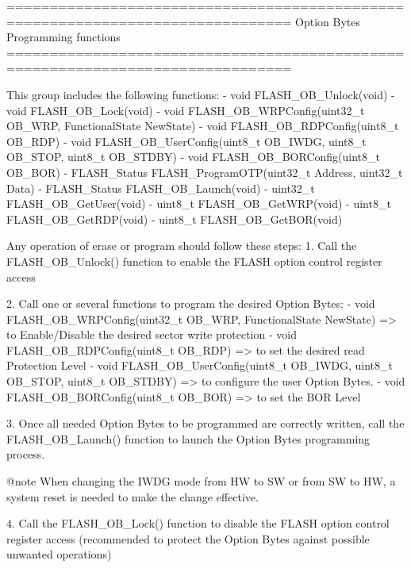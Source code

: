 \begin{DoxyVerb} ===============================================================================
                        Option Bytes Programming functions
 ===============================================================================  
 
   This group includes the following functions:
   - void FLASH_OB_Unlock(void)
   - void FLASH_OB_Lock(void)
   - void FLASH_OB_WRPConfig(uint32_t OB_WRP, FunctionalState NewState)
   - void FLASH_OB_RDPConfig(uint8_t OB_RDP)
   - void FLASH_OB_UserConfig(uint8_t OB_IWDG, uint8_t OB_STOP, uint8_t OB_STDBY)
   - void FLASH_OB_BORConfig(uint8_t OB_BOR)
   - FLASH_Status FLASH_ProgramOTP(uint32_t Address, uint32_t Data)                                                     
   - FLASH_Status FLASH_OB_Launch(void)
   - uint32_t FLASH_OB_GetUser(void)                                            
   - uint8_t FLASH_OB_GetWRP(void)                                              
   - uint8_t FLASH_OB_GetRDP(void)                                                      
   - uint8_t FLASH_OB_GetBOR(void)
   
   Any operation of erase or program should follow these steps:
   1. Call the FLASH_OB_Unlock() function to enable the FLASH option control register access

   2. Call one or several functions to program the desired Option Bytes:
      - void FLASH_OB_WRPConfig(uint32_t OB_WRP, FunctionalState NewState) => to Enable/Disable 
        the desired sector write protection
      - void FLASH_OB_RDPConfig(uint8_t OB_RDP) => to set the desired read Protection Level
      - void FLASH_OB_UserConfig(uint8_t OB_IWDG, uint8_t OB_STOP, uint8_t OB_STDBY) => to configure 
        the user Option Bytes.
      - void FLASH_OB_BORConfig(uint8_t OB_BOR) => to set the BOR Level                          

   3. Once all needed Option Bytes to be programmed are correctly written, call the
      FLASH_OB_Launch() function to launch the Option Bytes programming process.
     
     @note When changing the IWDG mode from HW to SW or from SW to HW, a system 
           reset is needed to make the change effective.  

   4. Call the FLASH_OB_Lock() function to disable the FLASH option control register
      access (recommended to protect the Option Bytes against possible unwanted operations)\end{DoxyVerb}
 


